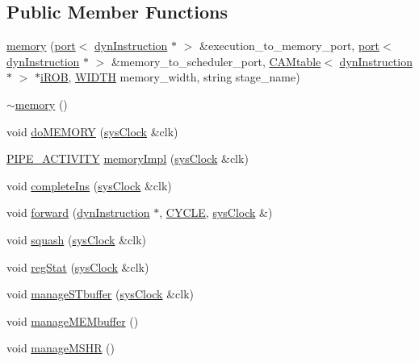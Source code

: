 \subsection*{Public Member Functions}
\begin{DoxyCompactItemize}
\item 
\hyperlink{classmemory_a7fbe6b698c210120727c89f9b76ac24f}{memory} (\hyperlink{classport}{port}$<$ \hyperlink{classdynInstruction}{dynInstruction} $\ast$ $>$ \&execution\_\-to\_\-memory\_\-port, \hyperlink{classport}{port}$<$ \hyperlink{classdynInstruction}{dynInstruction} $\ast$ $>$ \&memory\_\-to\_\-scheduler\_\-port, \hyperlink{classCAMtable}{CAMtable}$<$ \hyperlink{classdynInstruction}{dynInstruction} $\ast$ $>$ $\ast$\hyperlink{backend_2parser_8cpp_ad73ae25f81e6e99482f3fbd5ba9664ce}{iROB}, \hyperlink{global_2global_8h_a6fa2e24b8a418fa215e183264cbea3aa}{WIDTH} memory\_\-width, string stage\_\-name)
\item 
\hyperlink{classmemory_ae5893b724ce22f38b776558384f21680}{$\sim$memory} ()
\item 
void \hyperlink{classmemory_ae667b5ac087faff10a52913146d6b627}{doMEMORY} (\hyperlink{classsysClock}{sysClock} \&clk)
\item 
\hyperlink{unit_2stage_8h_ab00e4188e8b8974fecb1dfd12764cbb1}{PIPE\_\-ACTIVITY} \hyperlink{classmemory_a3c2b4025c057acb762cc6630f324d3dc}{memoryImpl} (\hyperlink{classsysClock}{sysClock} \&clk)
\item 
void \hyperlink{classmemory_a684c9f7770f14ce500c0bb3b2d34cfa5}{completeIns} (\hyperlink{classsysClock}{sysClock} \&clk)
\item 
void \hyperlink{classmemory_a7b6cc36f06ee64246e6dfbda76a3cf34}{forward} (\hyperlink{classdynInstruction}{dynInstruction} $\ast$, \hyperlink{global_2global_8h_a7e19a550ec11d1ed921deb20c22efb5b}{CYCLE}, \hyperlink{classsysClock}{sysClock} \&)
\item 
void \hyperlink{classmemory_a88818ea5e9263294dc5e1fef01fb068f}{squash} (\hyperlink{classsysClock}{sysClock} \&clk)
\item 
void \hyperlink{classmemory_a2f2be279e08cd2180fb070a954fbc674}{regStat} (\hyperlink{classsysClock}{sysClock} \&clk)
\item 
void \hyperlink{classmemory_a43b452151bf034cd654a711b21078097}{manageSTbuffer} (\hyperlink{classsysClock}{sysClock} \&clk)
\item 
void \hyperlink{classmemory_a12d98865ad7d63dd9010ff931a5806b2}{manageMEMbuffer} ()
\item 
void \hyperlink{classmemory_a8206d3f11dccb62eb978540807c30ae7}{manageMSHR} ()
\end{DoxyCompactItemize}


